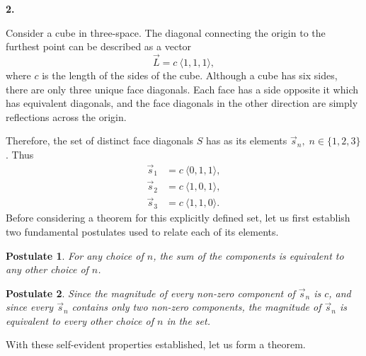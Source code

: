 \documentclass{article}
\newcommand{\qnumber}[1]{
\vspace{0.5cm}
\noindent
\textbf{#1.}
\vspace{4mm}
}
\newtheorem{post}{Postulate}
\begin{document}
\qnumber{2}

\noindent
Consider a cube in three-space. The diagonal connecting the origin to the furthest point can be described as a vector
\begin{equation} \label{eq:cube_diagonal}
    \vec{L}=c\:\langle 1, 1, 1 \rangle,
\end{equation}
where $c$ is the length of the sides of the cube. Although a cube has six sides, there are only three unique face diagonals. Each face has a side opposite it which has equivalent diagonals, and the face diagonals in the other direction are simply reflections across the origin. 

Therefore, the set of distinct face diagonals $S$ has as its elements $\vec{s}_n,\;n\in\{1, 2, 3\}$. Thus
\[
\begin{split}
    \vec{s}_1 &= c\:\langle 0, 1, 1 \rangle, \\
    \vec{s}_2 &= c\:\langle 1, 0, 1 \rangle, \\
    \vec{s}_3 &= c\:\langle 1, 1, 0 \rangle.
\end{split}  
\]
Before considering a theorem for this explicitly defined set, let us first establish two fundamental postulates used to relate each of its elements.
\begin{post} \label{post:sum_n}
    For any choice of $n$, the sum of the components is equivalent to any other choice of $n$.
\end{post}
\begin{post} \label{post:magnitude}
    Since the magnitude of every non-zero component of $\vec{s}_n$ is $c$, and since every $\vec{s}_n$ contains only two non-zero components, the magnitude of $\vec{s}_n$ is equivalent to every other choice of $n$ in the set.
\end{post}
\noindent
With these self-evident properties established, let us form a theorem.
\end{document}
